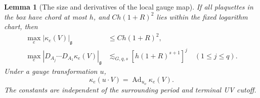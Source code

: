 \documentclass[11pt,reqno]{amsart}
\numberwithin{equation}{section}
\newtheorem{lemma}[theorem]{Lemma}
\theoremstyle{definition}
\theoremstyle{remark}
\newcommand{\g}{\mathfrak g}
\begin{document}
\begin{lemma}[The size and derivatives of the local gauge map]
\label{lem:local-physical-gauge}
If all plaquettes in the box have chord at most
\(h\), and \(Ch(1+R)^2\) lies within the fixed
logarithm chart, then
\begin{align}
       \max_e|\kappa_e(V)|_{\g}
                         &\le Ch(1+R)^2,
                         \label{eq:local-gauge-value}\\
       \max_e|D_{A_j}\cdots D_{A_1}\kappa_e(V)|_{\g}
                         &\lesssim_{G,q,s}
                                 [h(1+R)^{s+1}]^j
                      \quad(1\le j\le q).
                         \label{eq:local-gauge-ordered-derivatives}
\end{align}
Under a gauge transformation \(u\),
\begin{equation}
                \kappa_e(u\cdot V)
                         =\operatorname{Ad}_{u_o}\kappa_e(V).
 \label{eq:local-gauge-conjugation}
\end{equation}
The constants are independent of the surrounding
period and terminal UV cutoff.
\end{lemma}
\end{document}
